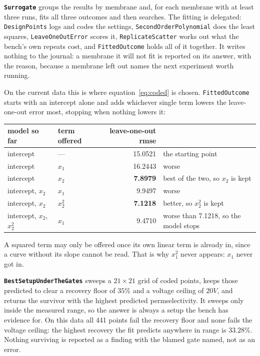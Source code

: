 \textbf{\texttt{Surrogate}} groups the results by membrane and, for each membrane with at
least three runs, fits all three outcomes and then searches. The fitting is delegated:
\texttt{DesignPoints} logs and codes the settings, \texttt{SecondOrderPolynomial} does the
least squares, \texttt{LeaveOneOutError} scores it, \texttt{ReplicateScatter} works out what
the bench's own repeats cost, and \texttt{FittedOutcome} holds all of it together. It writes
nothing to the journal: a membrane it will not fit is reported on its answer, with the
reason, because a membrane left out names the next experiment worth running.

On the current data this is where equation~\ref{eq:coded} is chosen. \texttt{FittedOutcome}
starts with an intercept alone and adds whichever single term lowers the leave-one-out error
most, stopping when nothing lowers it:

\begin{center}
\begin{tabular}{llrl}
\toprule
model so far & term offered & leave-one-out rmse & \\
\midrule
intercept                 & ---       & 15.0521 & the starting point \\
intercept                 & $x_1$     & 16.2443 & worse \\
intercept                 & $x_2$     & \textbf{7.8979} & best of the two, so $x_2$ is kept \\
intercept, $x_2$          & $x_1$     & 9.9497 & worse \\
intercept, $x_2$          & $x_2^2$   & \textbf{7.1218} & better, so $x_2^2$ is kept \\
intercept, $x_2$, $x_2^2$ & $x_1$     & 9.4710 & worse than 7.1218, so the model stops \\
\bottomrule
\end{tabular}
\end{center}

A squared term may only be offered once its own linear term is already in, since a curve
without its slope cannot be read. That is why $x_1^2$ never appears: $x_1$ never got in.

\textbf{\texttt{BestSetupUnderTheGates}} sweeps a $21 \times 21$ grid of coded points, keeps
those predicted to clear a recovery floor of $35\%$ and a voltage ceiling of
$20\unit{V}$, and returns the survivor with the highest predicted permselectivity. It sweeps
only inside the measured range, so the answer is always a setup the bench has evidence for.
On this data all 441 points fail the recovery floor and none fails the voltage ceiling: the
highest recovery the fit predicts anywhere in range is $33.28\%$. Nothing surviving is
reported as a finding with the blamed gate named, not as an error.

